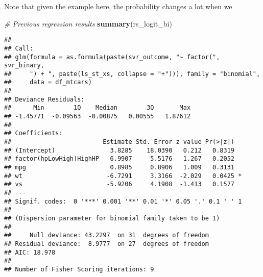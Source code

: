 \documentclass[
]{book}
\newenvironment{Shaded}{\begin{snugshade}}{\end{snugshade}}
\newcommand{\CommentTok}[1]{\textcolor[rgb]{0.56,0.35,0.01}{\textit{#1}}}
\newcommand{\KeywordTok}[1]{\textcolor[rgb]{0.13,0.29,0.53}{\textbf{#1}}}
\newcommand{\NormalTok}[1]{#1}
\begin{document}
Note that given the example here, the probability changes a lot when we

\begin{Shaded}
\begin{Highlighting}[]
\CommentTok{# Previous regression results}
\KeywordTok{summary}\NormalTok{(rs_logit_bi)}
\end{Highlighting}
\end{Shaded}

\begin{verbatim}
## 
## Call:
## glm(formula = as.formula(paste(svr_outcome, "~ factor(", svr_binary, 
##     ") + ", paste(ls_st_xs, collapse = "+"))), family = "binomial", 
##     data = df_mtcars)
## 
## Deviance Residuals: 
##      Min        1Q    Median        3Q       Max  
## -1.45771  -0.09563  -0.00875   0.00555   1.87612  
## 
## Coefficients:
##                         Estimate Std. Error z value Pr(>|z|)  
## (Intercept)               3.8285    18.0390   0.212   0.8319  
## factor(hpLowHigh)HighHP   6.9907     5.5176   1.267   0.2052  
## mpg                       0.8985     0.8906   1.009   0.3131  
## wt                       -6.7291     3.3166  -2.029   0.0425 *
## vs                       -5.9206     4.1908  -1.413   0.1577  
## ---
## Signif. codes:  0 '***' 0.001 '**' 0.01 '*' 0.05 '.' 0.1 ' ' 1
## 
## (Dispersion parameter for binomial family taken to be 1)
## 
##     Null deviance: 43.2297  on 31  degrees of freedom
## Residual deviance:  8.9777  on 27  degrees of freedom
## AIC: 18.978
## 
## Number of Fisher Scoring iterations: 9
\end{verbatim}
\end{document}

